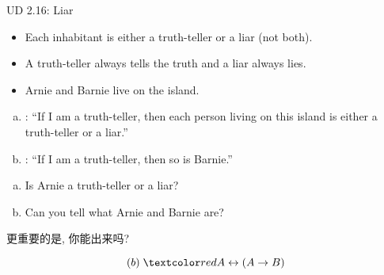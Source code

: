 
\begin{frame}{}
\end{frame}

\begin{frame}{}
  \begin{exampleblock}{UD 2.16: Liar}
    \begin{itemize}
      \item Each inhabitant is either a truth-teller or a liar (not both).
      \item A truth-teller always tells the truth and a liar always lies.
      \item Arnie and Barnie live on the island.
    \end{itemize}

    \begin{enumerate}[(a)]
      \item {}: ``If I am a truth-teller, then each person living on this island is either a truth-teller or a liar.''
      \item {}: ``If I am a truth-teller, then so is Barnie.''
    \end{enumerate}
  \end{exampleblock}

  \pause
  \vspace{0.20cm}
  \begin{enumerate}[(a)]
    \item Is Arnie a truth-teller or a liar?
    \item Can you tell what Arnie and Barnie are?
  \end{enumerate}

  \vspace{0.20cm}
  \pause
  \centerline{更重要的是, 你能出来吗?}
  \pause
  \[
    (b) \; \red{A \leftrightarrow (A \to B)}
  \]
\end{frame}

